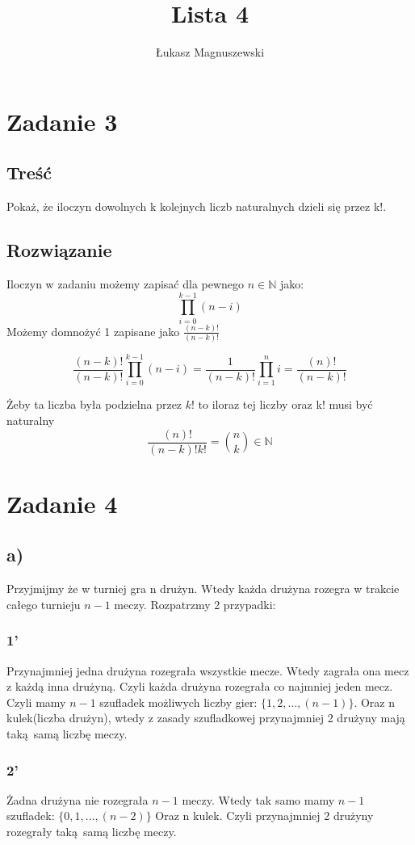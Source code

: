 \documentclass{article}
\title{Lista 4}
\author{Łukasz Magnuszewski}
\date{\vspace{-5ex}}
\begin{document}
\maketitle

\section*{Zadanie 3}
\subsection*{Treść}
Pokaż, że iloczyn dowolnych k kolejnych liczb naturalnych dzieli się przez k!.
\subsection*{Rozwiązanie}
Iloczyn w zadaniu możemy zapisać dla pewnego $n \in \mathbb{N}$ jako:
\[\prod^{k-1}_{i = 0} (n-i)\]
Możemy domnożyć 1 zapisane jako $\frac{(n-k)!}{(n-k)!}$

\[\frac{(n-k)!}{(n-k)!} \prod^{k-1}_{i = 0} (n-i)  = \frac{1}{(n-k)!} \prod^{n}_{i=1} i  = \frac{(n)!}{(n-k)!}\]

Żeby ta liczba była podzielna przez $k!$ to iloraz tej liczby oraz k! musi być naturalny
\[\frac{(n)!}{(n-k)! k!} = {n\choose k} \in \mathbb{N} \]

\section*{Zadanie 4}
\subsection*{a)}
Przyjmijmy że w turniej gra n drużyn. Wtedy każda drużyna rozegra w trakcie całego turnieju $n-1$ meczy. Rozpatrzmy 2 przypadki:
\subsubsection*{1'}
Przynajmniej jedna drużyna rozegrała wszystkie mecze. Wtedy zagrała ona mecz z każdą inna drużyną. Czyli każda drużyna rozegrała co najmniej jeden mecz. Czyli mamy $n-1$ szufladek możliwych liczby gier: $\{1, 2, \ldots  ,(n-1)\}$. Oraz n kulek(liczba drużyn), wtedy z zasady szufladkowej przynajmniej 2 drużyny mają taką samą liczbę meczy.

\subsubsection*{2'}
Żadna drużyna nie rozegrała $n-1$ meczy. Wtedy tak samo mamy $n-1$ szufladek: $\{0,1, \ldots ,(n-2)\}$ Oraz n kulek. Czyli przynajmniej 2 drużyny rozegrały taką samą liczbę meczy.
\end{document}
